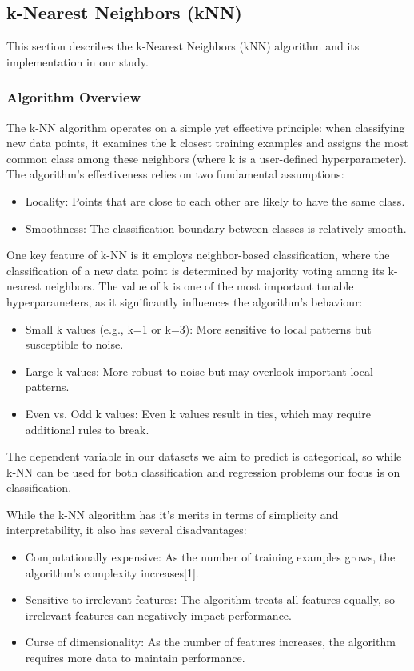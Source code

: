 \subsection{k-Nearest Neighbors (kNN)}
\label{subsec:methods-knn}

This section describes the k-Nearest Neighbors (kNN) algorithm and its implementation in our study.


\subsubsection{Algorithm Overview}

The k-NN algorithm operates on a simple yet effective principle: when classifying new data points, 
it examines the k closest training examples and assigns the most common class among these neighbors (where k is a user-defined hyperparameter). 
The algorithm's effectiveness relies on two fundamental assumptions:
\begin{itemize}
    \item Locality: Points that are close to each other are likely to have the same class.
    \item Smoothness: The classification boundary between classes is relatively smooth.
\end{itemize}

One key feature of k-NN is it employs neighbor-based classification, where the classification of a new data point 
is determined by majority voting among its k-nearest neighbors. 
The value of k is one of the most important tunable hyperparameters, as it significantly influences the algorithm's behaviour:
\begin{itemize}
    \item Small k values (e.g., k=1 or k=3): More sensitive to local patterns but susceptible to noise.
    \item Large k values: More robust to noise but may overlook important local patterns.
    \item Even vs. Odd k values: Even k values result in ties, which may require additional rules to break.
\end{itemize}

The dependent variable in our datasets we aim to predict is categorical, so while k-NN can be used for both classification and regression problems 
our focus is on classification.

While the k-NN algorithm has it's merits in terms of simplicity and interpretability, it also has several disadvantages:
\begin{itemize}
    \item Computationally expensive: As the number of training examples grows, the algorithm's complexity increases[1]. 
    \item Sensitive to irrelevant features: The algorithm treats all features equally, so irrelevant features can negatively impact performance.
    \item Curse of dimensionality: As the number of features increases, the algorithm requires more data to maintain performance.
\end{itemize}

